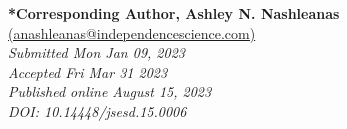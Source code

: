 \documentclass[11.5pt]{sig-alternate}
\begin{document}



\textbf{*Corresponding Author, Ashley N. Nashleanas}\\
\href{mailto:anashleanas@independencescience.com}{(anashleanas@independencescience.com)} \\
\textit{Submitted Mon Jan 09, 2023 }\\
\textit{Accepted Fri Mar 31 2023} \\
\textit{Published online August 15, 2023} \\
\textit{DOI: 10.14448/jsesd.15.0006} \\

\pagebreak
\pagebreak

\vspace{5mm}
\section*{\vspace{140mm}}
\end{document}
